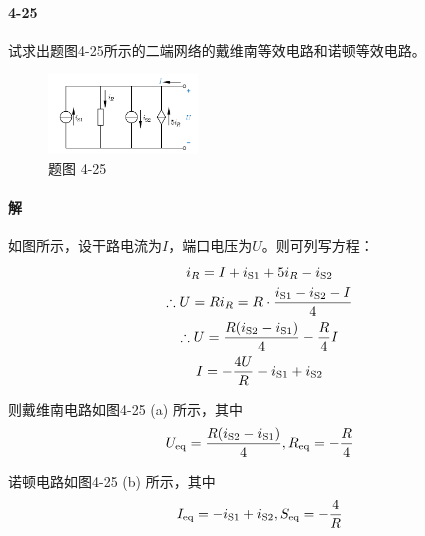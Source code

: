 \documentclass[hyperref, UTF8]{ctexart}
\newcommand{\source}{{\rm S}}
\begin{document}
\paragraph{4-25}\label{4-25}
试求出题图4-25所示的二端网络的戴维南等效电路和诺顿等效电路。

\begin{figure}[!htb]
\centering
\includegraphics[width=0.353\textwidth]{p4-25.png}
\caption*{题图 4-25}
\end{figure}

\paragraph{解}如图所示，设干路电流为$I$，端口电压为$U$。则可列写方程：
\begin{gather*}
i_R=I+i_{\source 1}+5i_R-i_{\source 2} \\
\therefore U = Ri_R = R \cdot \frac{i_{\source 1}-i_{\source 2}-I}{4} \\
\therefore U = \frac{R(i_{\source 2}-i_{\source 1})}{4} - \frac{R}{4}I \\
I = -\frac{4U}{R} - i_{\source 1} + i_{\source 2}
\end{gather*}

则戴维南电路如图4-25 (a) 所示，其中
$$
U_{\rm eq}=\frac{R(i_{\source 2}-i_{\source 1})}{4}, 
R_{\rm eq}= - \frac{R}{4} 
$$

诺顿电路如图4-25 (b) 所示，其中
$$
I_{\rm eq}= - i_{\source 1} + i_{\source 2},
S_{\rm eq}= -\frac{4}{R}
$$
\end{document}
